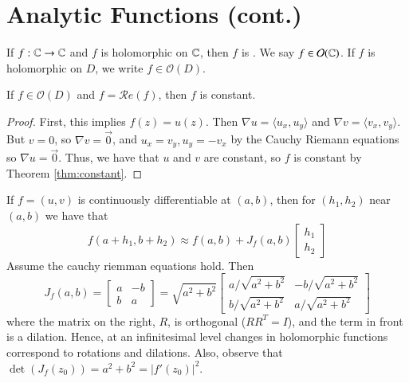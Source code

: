 \section{Analytic Functions (cont.)}

\begin{definition}
    If $f:\mathbb C\rightarrow \mathbb C$ and $f$ is holomorphic on $\mathbb C$, then $f$ is . We say $f \in \mathcal{O}(\mathbb C)$. If $f$ is holomorphic on $D$, we write $f \in \mathcal{O}(D)$.
\end{definition}


\begin{theorem}
    If $f \in \mathcal{O}(D)$ and $f = \mathscr{R}e(f)$, then $f$ is constant.
\end{theorem}
\begin{proof}
    First, this implies $f(z) = u(z)$. Then $\nabla u = \langle u_x,u_y\rangle$ and $\nabla v = \langle v_x, v_y\rangle$. But $v = 0$, so $\nabla v = \vec{0}$, and $u_x = v_y, u_y = -v_x$ by the Cauchy Riemann equations so $\nabla u = \vec{0}$. Thus, we have that $u$ and $v$ are constant, so $f$ is constant by Theorem \ref{thm:constant}.
\end{proof}

If $f = (u,v)$ is continuously differentiable at $(a,b)$, then for $(h_1,h_2)$ near $(a,b)$ we have that \begin{equation*}
    f(a+h_1,b+h_2) \approx f(a,b) + J_f(a,b)\begin{bmatrix} h_1 \\ h_2 \end{bmatrix}
\end{equation*}
Assume the cauchy riemman equations hold. Then \begin{equation*}
    J_f(a,b) = \begin{bmatrix} a & -b \\ b & a \end{bmatrix} = \sqrt{a^2+b^2}\begin{bmatrix} a/\sqrt{a^2+b^2} & -b/\sqrt{a^2+b^2} \\ b/\sqrt{a^2+b^2} & a/\sqrt{a^2+b^2} \end{bmatrix}
\end{equation*}
where the matrix on the right, $R$, is orthogonal ($RR^T = I$), and the term in front is a dilation. Hence, at an infinitesimal level changes in holomorphic functions correspond to rotations and dilations. Also, observe that $\det(J_f(z_0)) = a^2+b^2 = |f'(z_0)|^2$.

